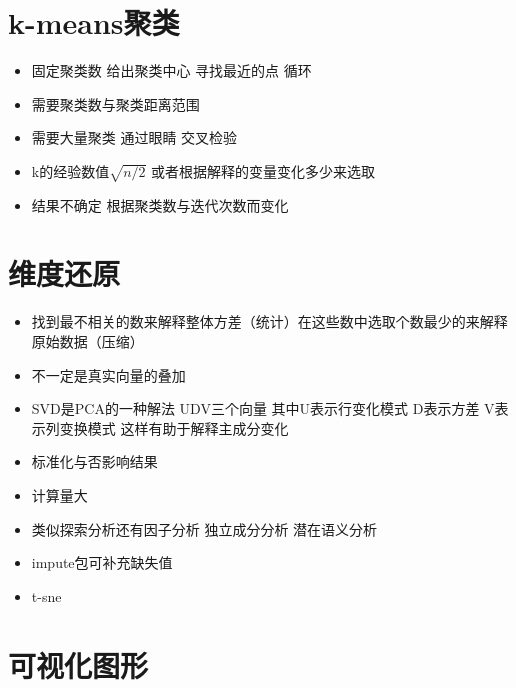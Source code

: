 \documentclass[
]{book}
\providecommand{\tightlist}{%
  \setlength{\itemsep}{0pt}\setlength{\parskip}{0pt}}
\begin{document}
\hypertarget{k-meansux805aux7c7b}{%
\section{k-means聚类}\label{k-meansux805aux7c7b}}

\begin{itemize}
\tightlist
\item
  固定聚类数 给出聚类中心 寻找最近的点 循环
\item
  需要聚类数与聚类距离范围
\item
  需要大量聚类 通过眼睛 交叉检验
\item
  k的经验数值\(\sqrt{n/2}\) 或者根据解释的变量变化多少来选取
\item
  结果不确定 根据聚类数与迭代次数而变化
\end{itemize}

\hypertarget{ux7ef4ux5ea6ux8fd8ux539f}{%
\section{维度还原}\label{ux7ef4ux5ea6ux8fd8ux539f}}

\begin{itemize}
\tightlist
\item
  找到最不相关的数来解释整体方差（统计）在这些数中选取个数最少的来解释原始数据（压缩）
\item
  不一定是真实向量的叠加
\item
  SVD是PCA的一种解法 UDV三个向量 其中U表示行变化模式 D表示方差 V表示列变换模式 这样有助于解释主成分变化
\item
  标准化与否影响结果
\item
  计算量大
\item
  类似探索分析还有因子分析 独立成分分析 潜在语义分析
\item
  impute包可补充缺失值
\item
  t-sne
\end{itemize}

\hypertarget{ux53efux89c6ux5316ux56feux5f62}{%
\section{可视化图形}\label{ux53efux89c6ux5316ux56feux5f62}}
\end{document}
